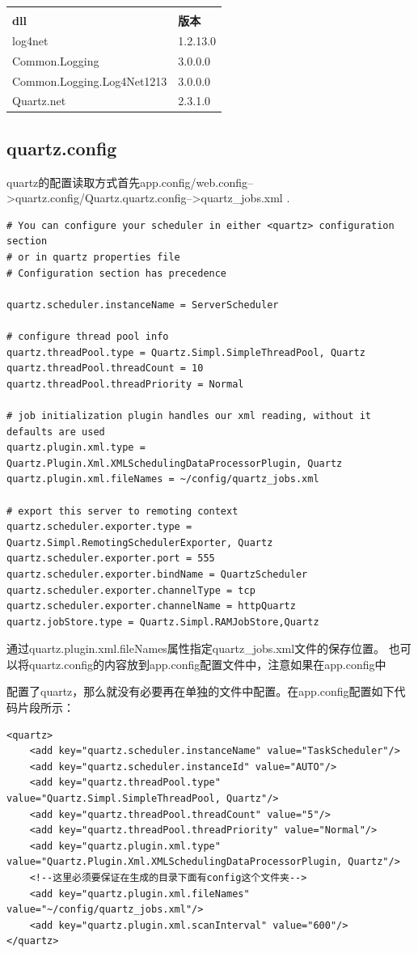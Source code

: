 \documentclass{book}
\begin{document}
\begin{tabular}{ll}
	\multirow{1}{*}{}			
	& \multicolumn{1}{c}{}\\
	\textbf{dll} & \textbf{版本}\\
	log4net & 1.2.13.0\\
	Common.Logging & 3.0.0.0\\
	Common.Logging.Log4Net1213 & 3.0.0.0\\
	Quartz.net & 2.3.1.0\\							
\end{tabular}


\subsection{quartz.config}

quartz的配置读取方式首先app.config/web.config-->quartz.config/Quartz.quartz.config-->quartz\_jobs.xml .

\begin{lstlisting}
# You can configure your scheduler in either <quartz> configuration section  
# or in quartz properties file  
# Configuration section has precedence  

quartz.scheduler.instanceName = ServerScheduler  

# configure thread pool info  
quartz.threadPool.type = Quartz.Simpl.SimpleThreadPool, Quartz  
quartz.threadPool.threadCount = 10  
quartz.threadPool.threadPriority = Normal  

# job initialization plugin handles our xml reading, without it defaults are used  
quartz.plugin.xml.type = Quartz.Plugin.Xml.XMLSchedulingDataProcessorPlugin, Quartz  
quartz.plugin.xml.fileNames = ~/config/quartz_jobs.xml  

# export this server to remoting context  
quartz.scheduler.exporter.type = Quartz.Simpl.RemotingSchedulerExporter, Quartz  
quartz.scheduler.exporter.port = 555  
quartz.scheduler.exporter.bindName = QuartzScheduler  
quartz.scheduler.exporter.channelType = tcp  
quartz.scheduler.exporter.channelName = httpQuartz 
quartz.jobStore.type = Quartz.Simpl.RAMJobStore,Quartz
\end{lstlisting}

通过quartz.plugin.xml.fileNames属性指定quartz\_jobs.xml文件的保存位置。
也可以将quartz.config的内容放到app.config配置文件中，注意如果在app.config中

配置了quartz，那么就没有必要再在单独的文件中配置。在app.config配置如下代码片段所示：
\begin{lstlisting}
<quartz>
	<add key="quartz.scheduler.instanceName" value="TaskScheduler"/>
	<add key="quartz.scheduler.instanceId" value="AUTO"/>
	<add key="quartz.threadPool.type" value="Quartz.Simpl.SimpleThreadPool, Quartz"/>
	<add key="quartz.threadPool.threadCount" value="5"/>
	<add key="quartz.threadPool.threadPriority" value="Normal"/>
	<add key="quartz.plugin.xml.type" value="Quartz.Plugin.Xml.XMLSchedulingDataProcessorPlugin, Quartz"/>
	<!--这里必须要保证在生成的目录下面有config这个文件夹-->
	<add key="quartz.plugin.xml.fileNames" value="~/config/quartz_jobs.xml"/>
	<add key="quartz.plugin.xml.scanInterval" value="600"/>   
</quartz>
\end{lstlisting}
\end{document}
